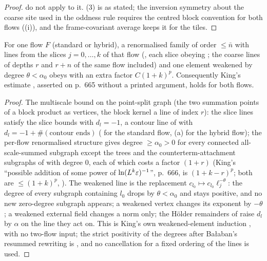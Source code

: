 \begin{proof}
do not apply to it. (3) is as stated; the inversion symmetry about the coarse site used in the oddness rule requires the centred block convention for both flows ((i)), and the frame-covariant average keeps it for the tiles.
\end{proof}

\begin{corollary}\label{rot:cor:OF}
For one flow $F$ (standard or hybrid), a renormalised family of order $\le\bar n$ with lines from the slices $j=0,\dots,k$ of that flow (\cite[(3.76)]{K1}, each slice obeying \cite[(3.63)--(3.65)]{K1}; the coarse lines of depths $r$ and $r+n$ of the same flow included) and one element weakened by degree $\theta<\alpha_0$ obeys \cite[(1.33)]{Ba3} with an extra factor $C(1+k)^p$. Consequently King's estimate \cite[Prop.~3.6]{K1}, asserted on p.~665 without a printed argument, holds for both flows.
\end{corollary}
\begin{proof}
The multiscale bound on the point-split graph (the two summation points of a block product as vertices, the block kernel a line of index $r$): the slice lines satisfy the slice bounds with $d_l=-1$, a contour line of \cite[(3.26)--(3.27)]{K1} with $d_l=-1+\#(\text{contour ends})$ (\cite[(3.63)--(3.65), Prop.~3.7, Thm.~3.3]{K1} for the standard flow, (a) for the hybrid flow); the per-flow renormalised structure gives degree $\ge\alpha_0>0$ for every connected all-scale-summed subgraph except the trees \cite[(2.4)]{Ba3} and the counterterm-attachment subgraphs of \cite[(3.78)]{K1} with degree $0$, each of which costs a factor $(1+r)$ (King's ``possible addition of some power of $\ln(L^k\varepsilon)^{-1}$'', p.~666, is $(1+k-r)^p$; both are $\le(1+k)^p$, ). The weakened line is the replacement $c_{l_0}\mapsto c_{l_0}\ell_j^{-\theta}$: the degree of every subgraph containing $l_0$ drops by $\theta<\alpha_0$ and stays positive, and no new zero-degree subgraph appears; a weakened vertex changes its exponent by $-\theta$; a weakened external field changes a norm only; the H\"older remainders of \cite[(3.83)]{K1} raise $d_l$ by $\alpha$ on the line they act on. This is King's own weakened-element induction \cite[(3.67)--(3.70)]{K1}, with no two-flow input; the strict positivity of the degrees after Ba{\l}aban's resummed rewriting is \cite[(3.5)]{Ba3}, and no cancellation for a fixed ordering of the lines is used.
\end{proof}






